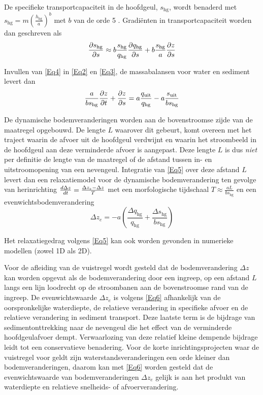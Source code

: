 De specifieke transportcapaciteit in de hoofdgeul, $s_\text{hg}$, wordt benaderd met $s_\text{hg} = m \left ( \frac{h_\text{hg}}{a} \right )^b$ met $b$ van de orde 5 \citep{Engelundh67}.
Gradi\"enten in transportcapaciteit worden dan geschreven als
%
\begin{equation}
\pdiff{s_\text{hg}}{s} \approx b \frac{s_\text{hg}}{q_\text{hg}} \pdiff{q_\text{hg}}{s} + b \frac{s_\text{hg}}{a} \pdiff{z}{s}
\label{Eq4}
\end{equation}

Invullen van \autoref{Eq4} in \autoref{Eq2} en \autoref{Eq3}, de massabalansen voor water en sediment levert dan
%
\begin{equation}
\frac{a}{b s_\text{hg}} \pdiff{z}{t} + \pdiff{z}{s} = a \frac{q_\text{uit}}{q_\text{hg}} - a \frac{s_\text{uit}}{b s_\text{hg}}
\label{Eq5}
\end{equation}

De dynamische bodemveranderingen worden aan de bovenstroomse zijde van de maatregel opgebouwd.
De lengte $L$ waarover dit gebeurt, komt overeen met het traject waarin de afvoer uit de hoofdgeul verdwijnt en waarin het stroombeeld in de hoofdgeul aan deze verminderde afvoer is aangepast.
Deze lengte $L$ is dus \emph{niet} per definitie de lengte van de maatregel of de afstand tussen in- en uitstroomopening van een
nevengeul.
Integratie van \autoref{Eq5} over deze afstand $L$ levert dan een relaxatiemodel voor de dynamische bodemverandering ten gevolge van herinrichting $\diff{\Delta z}{t} = \frac{\Delta z_e - \Delta z}{T}$ met een morfologische tijdschaal $T \approx \frac{a L}{bs_\text{hg}}$ en een evenwichtsbodemverandering
%
\begin{equation}
\Delta z_e = -a \left ( \frac{\Delta q_\text{hg}}{q_\text{hg}} + \frac{\Delta s_\text{hg}}{b s_\text{hg}} \right )
\label{Eq6}
\end{equation}

Het relaxatiegedrag volgens \autoref{Eq5} kan ook worden gevonden in numerieke modellen (zowel 1D als 2D).

Voor de afleiding van de vuistregel wordt gesteld dat de bodemverandering $\Delta z$ kan worden opgevat als de bodemverandering door een ingreep, op een afstand $L$ langs een lijn loodrecht op de stroombanen aan de bovenstroomse rand van de ingreep.
De evenwichtswaarde $\Delta z_e$ is volgens \autoref{Eq6} afhankelijk van de oorspronkelijke waterdiepte, de relatieve verandering in specifieke afvoer en de relatieve verandering in sediment transport.
Deze laatste term is de bijdrage van sedimentonttrekking naar de nevengeul die het effect van de verminderde hoofdgeulafvoer dempt.
Verwaarlozing van deze relatief kleine dempende bijdrage leidt tot een conservatieve benadering.
Voor de korte inrichtingsprojecten waar de vuistregel voor geldt zijn waterstandsveranderingen een orde kleiner dan bodemveranderingen, daarom kan met \autoref{Eq6} worden gesteld dat de evenwichtswaarde van bodemveranderingen $\Delta z_e$ gelijk is aan het produkt van waterdiepte en relatieve snelheids- of afvoerverandering.

